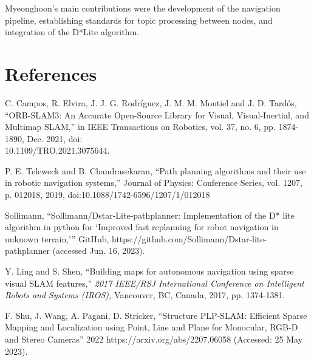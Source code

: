 \documentclass[10pt,english]{article}
\begin{document}
Myeonghoon's main contributions were the development of the navigation pipeline, establishing standards for topic processing between nodes, and integration of the D*Lite algorithm.

\clearpage

\section*{References}

\begin{enumerate}[leftmargin=*,label={\texttt{[\arabic*]}},noitemsep]
    \item C. Campos, R. Elvira, J. J. G. Rodríguez, J. M. M. Montiel and J. D. Tardós, ``ORB-SLAM3: An Accurate Open-Source Library for Visual, Visual-Inertial, and Multimap SLAM,'' in IEEE Transactions on Robotics, vol. 37, no. 6, pp. 1874-1890, Dec. 2021, doi:\\10.1109/TRO.2021.3075644.
    \item P. E. Teleweck and B. Chandrasekaran, ``Path planning algorithms and their use in robotic navigation systems,'' Journal of Physics: Conference Series, vol. 1207, p. 012018, 2019, doi:10.1088/1742-6596/1207/1/012018
    \item Sollimann, ``Sollimann/Dstar-Lite-pathplanner: Implementation of the D* lite algorithm in python for `Improved fast replanning for robot navigation in unknown terrain,''' GitHub, https://github.com/Sollimann/Dstar-lite-pathplanner (accessed Jun. 16, 2023).
    \item Y. Ling and S. Shen, ``Building maps for autonomous navigation using sparse visual SLAM features,'' \textit{2017 IEEE/RSJ International Conference on Intelligent Robots and Systems (IROS),} Vancouver, BC, Canada, 2017, pp. 1374-1381.
    \item F. Shu, J. Wang, A. Pagani, D. Stricker,  ``Structure PLP-SLAM: Efficient Sparse Mapping and Localization using Point, Line and Plane for Monocular, RGB-D and Stereo Cameras'' 2022
    https://arxiv.org/abs/2207.06058 (Accessed: 25 May 2023).
\end{enumerate}
\end{document}
